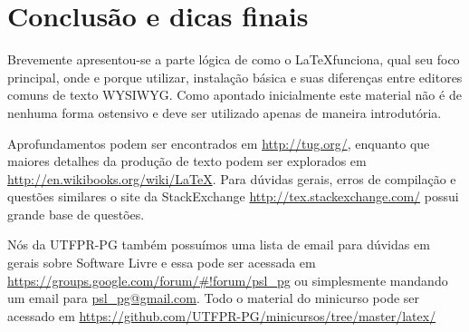 \section{Conclusão e dicas finais}
Brevemente apresentou-se a parte lógica de como o \LaTeX\space funciona, qual seu foco principal, onde e porque utilizar, instalação básica e suas diferenças entre editores comuns de texto WYSIWYG. Como apontado inicialmente este material não é de nenhuma forma ostensivo e deve ser utilizado apenas de maneira introdutória.

Aprofundamentos podem ser encontrados em \url{http://tug.org/}, enquanto que maiores detalhes da produção de texto podem ser explorados em \newline\url{http://en.wikibooks.org/wiki/LaTeX}. Para dúvidas gerais, erros de compilação e questões similares o site \tex\space da \textsf{StackExchange} \url{http://tex.stackexchange.com/} possui grande base de questões.

Nós da UTFPR-PG também possuímos uma lista de email para dúvidas em gerais sobre Software Livre e essa pode ser acessada em \newline\url{https://groups.google.com/forum/#!forum/psl_pg} ou simplesmente mandando um email para \url{psl_pg@gmail.com}. Todo o material do minicurso pode ser acessado em \url{https://github.com/UTFPR-PG/minicursos/tree/master/latex/}
